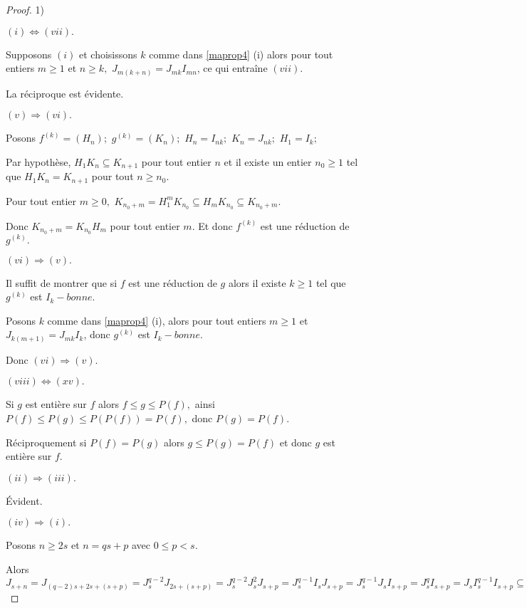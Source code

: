 \documentclass[12pt, a4paper, oneside]{book}
\begin{document}
\begin{proof}
	
	1)
	
	$(i)\Longleftrightarrow (vii).$
	
	Supposons $(i)$ et choisissons $k$ comme dans \ref{maprop4} (i) alors pour tout
	entiers $m\geq 1$ et $n\geq k,$ $J_{m(k+n)}=J_{mk}I_{mn}$, ce qui entraîne $(vii).$
	
	La réciproque est évidente.
	
	$(v)\Longrightarrow (vi).$
	
	Posons $f^{(k)}=(H_{n});$ $g^{(k)}=(K_{n});$ $H_{n}=I_{nk};$ $K_{n}=J_{nk};$ 
	$H_{1}=I_{k};$
	
	Par hypothèse, $H_{1}K_{n}\subseteq K_{n+1}$ pour tout entier $n$ et il
	existe un entier $n_{0}\geq 1$ tel que $H_{1}K_{n}=K_{n+1}$ pour tout $n\geq
	n_{0}.$
	
	Pour tout entier $m\geq 0,$ $K_{n_{0}+m}=H_{1}^{m}K_{n_{0}}\subseteq
	H_{m}K_{n_{0}}\subseteq K_{n_{0}+m}.$
	
	Donc $K_{n_{0}+m}=K_{n_{0}}H_{m}$ pour tout entier $m.$ Et donc $f^{(k)}$
	est une réduction de $g^{(k)}.$
	
	$(vi)\Longrightarrow (v).$
	
	Il suffit de montrer que si $f$ est une réduction de $g$ alors il existe 
	$k\geq 1$ tel que $g^{(k)}$ est $I_{k}-bonne.$
	
	Posons $k$ comme dans \ref{maprop4} (i), alors pour tout entiers $m\geq 1$ et  $J_{k(m+1)}=J_{mk}I_{k}$, donc $g^{(k)}$ est $I_{k}-bonne.$
	
	Donc $(vi)\Longrightarrow (v).$
	
	$(viii)\Longleftrightarrow (xv).$
	
	Si $g$ est entière sur $f$ alors $f\leq g\leq P(f),$ ainsi $P(f)\leq
	P(g)\leq P(P(f))=P(f),$ donc $P(g)=P(f).$
	
	Réciproquement si $P(f)=P(g)$ alors $g\leq P(g)=P(f)$ et donc $g$ est entière sur $f.$
	
	$(ii)\Longrightarrow (iii).$
	
	Évident.
	
	$(iv)\Longrightarrow (i).$
	
	Posons $n\geq 2s$ et $n=qs+p$ avec $0\leq p<s.$
	
	Alors $J_{s+n}=J_{(q-2)s+2s+(s+p)}=J_{s}^{q-2}J_{2s+(s+p)}=J_{s}^{q-2}J_{s}^{2}J_{s+p}=J_{s}^{q-1}I_{s}J_{s+p}=J_{s}^{q-1}J_{s}I_{s+p}=J_{s}^{q}I_{s+p}=J_{s}I_{s}^{q-1}I_{s+p}\subseteq J_{s}I_{n}\subseteq J_{s+n}.
	$
	

\end{proof}
\end{document}
